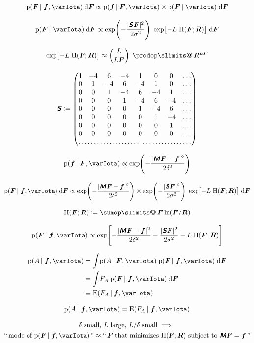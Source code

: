 \documentclass[\ifafour a4paper,12pt,\else a5paper,10pt,\fi%
onecolumn,oneside,article,%
british%
]{memoir}
\makeatletter
\theoremstyle{remark}
\theoremstyle{innote}
\def\sum{\DOTSI\sumop\slimits@}
\def\prod{\DOTSI\prodop\slimits@}
\newcommand*{\mathte}[1]{\textbf{\textit{\textsf{#1}}}}
\newcommand*{\di}{\mathrm{d}}%
\newcommand*{\defd}{\coloneqq}
\DeclarePairedDelimiter\abs{\lvert}{\rvert}
\newcommand*{\pf}{\mathrm{p}}%
\newcommand*{\E}{\mathrm{E}}
\renewcommand*{\|}[1][]{\nonscript\,#1\vert\nonscript\;\mathopen{}}
\newcommand*{\tprod}{\mathop{\textstyle\prod}\nolimits}
\newcommand*{\tsum}{\mathop{\textstyle\sum}\nolimits}
\newcommand*{\yff}{f}
\newcommand*{\yf}{\bm{\yff}}
\newcommand*{\yFF}{F}
\newcommand*{\yF}{\bm{\yFF}}
\newcommand*{\yRR}{R}
\newcommand*{\yR}{\bm{\yRR}}
\newcommand*{\yL}{L}
\newcommand*{\yMM}{M}
\newcommand*{\yM}{\mathte{\yMM}}
\newcommand*{\ymm}{\delta}
\newcommand*{\ySS}{S}
\newcommand*{\yS}{\mathte{\ySS}}
\newcommand*{\yss}{\sigma}
\newcommand*{\re}{\mathrm{H}}
\newcommand*{\yI}{\varIota}
\newcommand*{\yD}{\yf}
\newcommand*{\yA}{A}
\newcommand*{\ysum}{\bm{\tsum}}
\newcommand*{\yprod}{\bm{\tprod}}
\makeatother
\begin{document}
\[
  \pf(\yF \| \yD, \yI)\;\di\yF \propto
\pf(\yD \|\yF, \yI)\times  \pf(\yF \| \yI)\;\di\yF
\]

\[
  \pf(\yF \| \yI)\;\di\yF \propto
  \exp\Biggl(-\frac{\abs{\yS\yF}^{2}}{2\yss^{2}}\Biggr)
  \;
\exp\bigl[-\yL \; \re(\yF; \yR) \bigr] \;\di\yF
\]

\[
  \exp\bigl[-\yL \; \re(\yF; \yR) \bigr] \approx
\binom{\yL}{\yL\yF}\;\yprod \yR^{\yL\yF}
\]

\[
  \yS \defd
  \begin{pmatrix}
  1 & -4 &  6 & -4 &  1 &  0 &  0 & \dotso \\
  0 &  1 & -4 &  6 & -4 &  1 &  0 & \dotso \\
  0 &  0 &  1 & -4 &  6 & -4 &  1 & \dotso \\
  0 &  0 &  0 &  1 & -4 &  6 & -4 & \dotso \\
  0 &  0 &  0 &  0 &  1 & -4 &  6 & \dotso \\
  0 &  0 &  0 &  0 &  0 &  1 & -4 & \dotso \\
  0 &  0 &  0 &  0 &  0 &  0 &  1 & \dotso \\
  0 &  0 &  0 &  0 &  0 &  0 &  0 & \dotso \\
  \hdotsfor{8}
  \end{pmatrix}  
  \]

  
\[
  \pf(\yD \|\yF, \yI) \propto
  \exp\Biggl(-\frac{\abs{\yM\yF-\yf}^{2}}{2\ymm^{2}}\Biggr)
\]

\[
  \pf(\yF \| \yD, \yI)\;\di\yF \propto
  \exp\Biggl(-\frac{\abs{\yM\yF-\yf}^{2}}{2\ymm^{2}}\Biggr)
  \times
  \exp\Biggl(-\frac{\abs{\yS\yF}^{2}}{2\yss^{2}}\Biggr)
  \;
\exp\bigl[-\yL \; \re(\yF; \yR) \bigr] \;\di\yF
\]

\[
\re(\yF; \yR) \defd \ysum \yF \ln(\yF/\yR)
\]

\[
  \pf(\yF \| \yD, \yI) \propto \exp\Biggl[
  -\frac{\abs{\yM\yF-\yf}^{2}}{2\ymm^{2}}
-\frac{\abs{\yS\yF}^{2}}{2\yss^{2}}
-\yL \; \re(\yF; \yR) \Biggr]
\]


\[
  \begin{split}
  \pf(\yA \| \yD, \yI) &=
  \int\! \pf(\yA \| \yF, \yI)\;\pf(\yF \| \yD, \yI)\;\di\yF
  \\
  &=  \int\! \yFF_{\yA}\;\pf(\yF \| \yD, \yI)\;\di\yF
  \\
  &\equiv \E(\yFF_{\yA} \| \yD, \yI)
\end{split}
\]

\[ \pf(\yA \| \yD, \yI) = \E(\yFF_{\yA} \| \yD, \yI) \]


\begin{multline*}
  \text{$\ymm$ small, $\yL$ large, $\yL/\ymm$ small} \implies{}\\
  \text{``\,mode of $\pf(\yF \| \yD, \yI)$\,''} \approx
  \text{``\,$\yF$ that minimizes
  $\re(\yF; \yR)$ subject to $\yM\yF=\yf$\,''}
\end{multline*}
\fi
  
\end{document}
